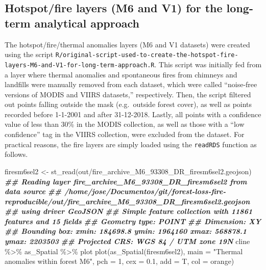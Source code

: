 \documentclass[10pt,landscape,a3paper]{article}
\newenvironment{Shaded}{\begin{snugshade}}{\end{snugshade}}
\newcommand{\AttributeTok}[1]{\textcolor[rgb]{0.77,0.63,0.00}{#1}}
\newcommand{\DecValTok}[1]{\textcolor[rgb]{0.00,0.00,0.81}{#1}}
\newcommand{\DocumentationTok}[1]{\textcolor[rgb]{0.56,0.35,0.01}{\textbf{\textit{#1}}}}
\newcommand{\FloatTok}[1]{\textcolor[rgb]{0.00,0.00,0.81}{#1}}
\newcommand{\FunctionTok}[1]{\textcolor[rgb]{0.00,0.00,0.00}{#1}}
\newcommand{\NormalTok}[1]{#1}
\newcommand{\OtherTok}[1]{\textcolor[rgb]{0.56,0.35,0.01}{#1}}
\newcommand{\SpecialCharTok}[1]{\textcolor[rgb]{0.00,0.00,0.00}{#1}}
\newcommand{\StringTok}[1]{\textcolor[rgb]{0.31,0.60,0.02}{#1}}
\begin{document}
\hypertarget{hotspotfire-layers-m6-and-v1-for-the-long-term-analytical-approach}{%
\subsection{Hotspot/fire layers (M6 and V1) for the long-term analytical
approach}\label{hotspotfire-layers-m6-and-v1-for-the-long-term-analytical-approach}}

The hotspot/fire/thermal anomalies layers (M6 and V1 datasets) were
created using the script
\texttt{R/original-script-used-to-create-the-hotspot-fire-layers-M6-and-V1-for-long-term-approach.R}.
This script was initially fed from a layer where thermal anomalies and
spontaneous fires from chimneys and landfills were manually removed from
each dataset, which were called ``noise-free versions of MODIS and VIIRS
datasets,'' respectively. Then, the script filtered out points falling
outside the mask (e.g.~outside forest cover), as well as points recorded
before 1-1-2001 and after 31-12-2018. Lastly, all points with a
confidence value of less than 30\% in the MODIS collection, as well as
those with a ``low confidence'' tag in the VIIRS collection, were
excluded from the dataset. For practical reasons, the fire layers are
simply loaded using the \texttt{readRDS} function as follows.

\begin{Shaded}
\begin{Highlighting}[]
\NormalTok{firesm6sel2 }\OtherTok{\textless{}{-}} \FunctionTok{st\_read}\NormalTok{(}\StringTok{\textquotesingle{}out/fire\_archive\_M6\_93308\_DR\_firesm6sel2.geojson\textquotesingle{}}\NormalTok{)}
\DocumentationTok{\#\# Reading layer \textasciigrave{}fire\_archive\_M6\_93308\_DR\_firesm6sel2\textquotesingle{} from data source }
\DocumentationTok{\#\#   \textasciigrave{}/home/jose/Documentos/git/forest{-}loss{-}fire{-}reproducible/out/fire\_archive\_M6\_93308\_DR\_firesm6sel2.geojson\textquotesingle{} }
\DocumentationTok{\#\#   using driver \textasciigrave{}GeoJSON\textquotesingle{}}
\DocumentationTok{\#\# Simple feature collection with 11861 features and 15 fields}
\DocumentationTok{\#\# Geometry type: POINT}
\DocumentationTok{\#\# Dimension:     XY}
\DocumentationTok{\#\# Bounding box:  xmin: 184698.8 ymin: 1964160 xmax: 568878.1 ymax: 2203503}
\DocumentationTok{\#\# Projected CRS: WGS 84 / UTM zone 19N}
\NormalTok{cline }\SpecialCharTok{\%\textgreater{}\%}\NormalTok{ as\_Spatial }\SpecialCharTok{\%\textgreater{}\%}\NormalTok{ plot}
\FunctionTok{plot}\NormalTok{(}\FunctionTok{as\_Spatial}\NormalTok{(firesm6sel2), }\AttributeTok{main =} \StringTok{"Thermal anomalies within forest M6"}\NormalTok{,}
     \AttributeTok{pch =} \DecValTok{1}\NormalTok{, }\AttributeTok{cex =} \FloatTok{0.1}\NormalTok{, }\AttributeTok{add =}\NormalTok{ T, }\AttributeTok{col =} \StringTok{\textquotesingle{}orange\textquotesingle{}}\NormalTok{)}
\end{Highlighting}
\end{Shaded}
\end{document}
